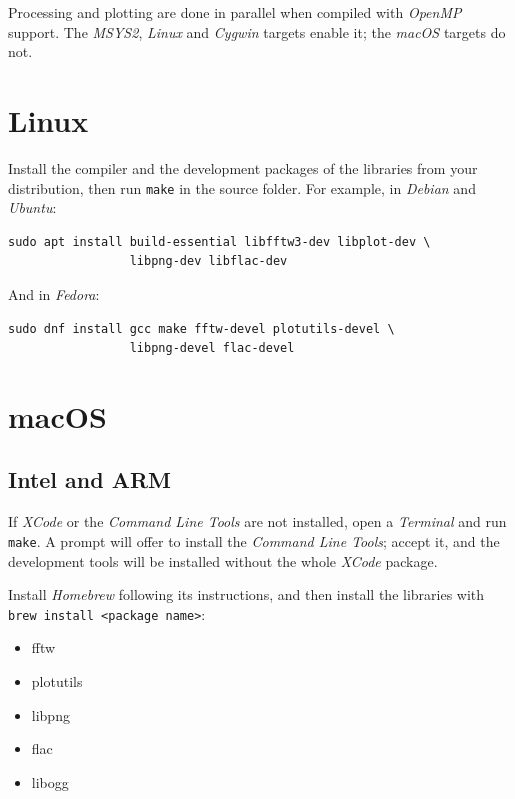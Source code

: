 \documentclass[10pt,a4paper]{report}
\begin{document}
\begin{appendices}
Processing and plotting are done in parallel when compiled with \textit{OpenMP} support. The \textit{MSYS2}, \textit{Linux} and \textit{Cygwin} targets enable it; the \textit{macOS} targets do not.

\section{Linux}

Install the compiler and the development packages of the libraries from your distribution, then run \texttt{make} in the source folder. For example, in \textit{Debian} and \textit{Ubuntu}:

\begin{verbatim}
sudo apt install build-essential libfftw3-dev libplot-dev \
                 libpng-dev libflac-dev
\end{verbatim}

And in \textit{Fedora}:

\begin{verbatim}
sudo dnf install gcc make fftw-devel plotutils-devel \
                 libpng-devel flac-devel
\end{verbatim}

\section{macOS}

\subsection{Intel and ARM}

If \textit{XCode} or the \textit{Command Line Tools} are not installed, open a \textit{Terminal} and run \texttt{make}. A prompt will offer to install the \textit{Command Line Tools}; accept it, and the development tools will be installed without the whole \textit{XCode} package.

Install \textit{Homebrew} \cite{homebrew} following its instructions, and then install the libraries with \texttt{brew install <package name>}:

\begin{itemize}
	\item fftw
	\item plotutils
	\item libpng
	\item flac
	\item libogg
\end{itemize}


\end{appendices}
\end{document}
